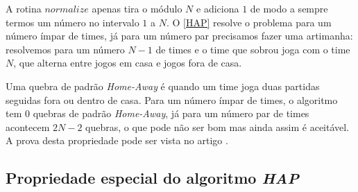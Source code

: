 \documentclass[a4paper,12pt,titlepage]{article}
\begin{document}
A rotina $normalize$ apenas tira o módulo $N$ e adiciona $1$ de modo a sempre termos um número no intervalo $1$ a $N$. 
O \ref{HAP} resolve o problema para um número ímpar de times, já para um número par precisamos fazer uma artimanha:
resolvemos para um número $N-1$ de times e o time que sobrou joga com o time $N$, que alterna entre jogos em casa e 
jogos fora de casa. 

Uma quebra de padrão \textit{Home-Away} é quando um time joga duas partidas seguidas fora ou dentro de casa. Para
um número ímpar de times, o algoritmo tem $0$ quebras de padrão \textit{Home-Away}, já para um número par de times
acontecem $2N-2$ quebras, o que pode não ser bom mas ainda assim é aceitável. A prova desta propriedade
pode ser vista no artigo \cite{90Schreuder}.

\subsection{Propriedade especial do algoritmo \textit{HAP}}



\end{document}
